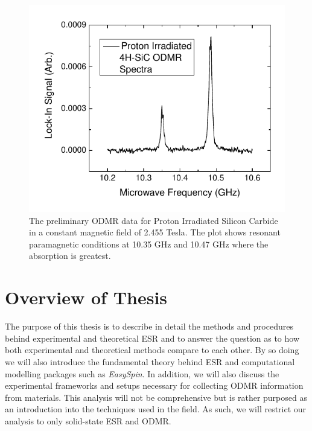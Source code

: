 \documentclass[oneside, astronomy, noacknowlegments]{BYUPhys}
\begin{document}
\begin{figure}
    \centerline{\includegraphics{p14-odmr}}
    \caption[Preliminary ODMR data]{\label{fig:PrelimODMR}
     The preliminary ODMR data for Proton Irradiated Silicon Carbide in a constant magnetic field of 2.455 Tesla. The plot shows resonant paramagnetic conditions at 10.35 GHz and 10.47 GHz where the absorption is greatest. }
\end{figure}

\section{Overview of Thesis}

The purpose of this thesis is to describe in detail the methods and procedures behind experimental and theoretical ESR and to answer the question as to how both experimental and theoretical methods compare to each other. By so doing we will also introduce the fundamental theory behind ESR and computational modelling packages such as \textit{EasySpin}. In addition, we will also discuss the experimental frameworks and setups necessary for collecting ODMR information from materials. This analysis will not be comprehensive but is rather purposed as an introduction into the techniques used in the field. As such, we will restrict our analysis to only solid-state ESR and ODMR.
\end{document}
